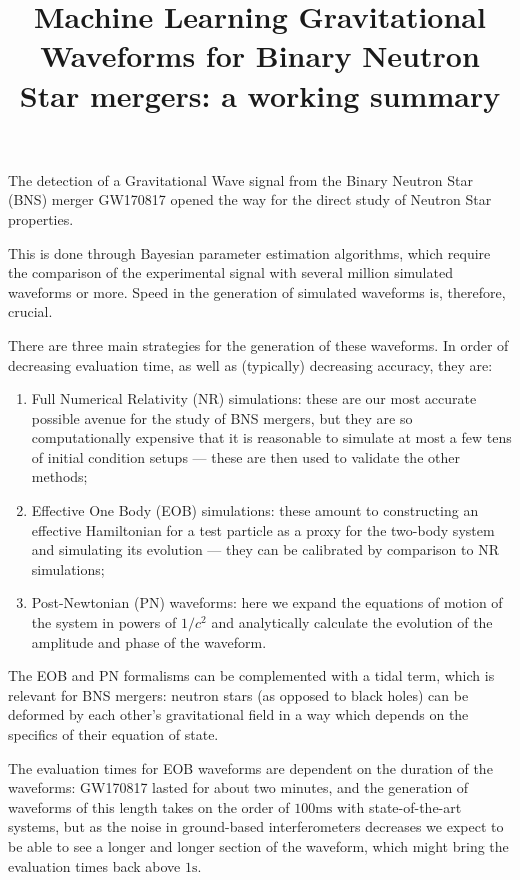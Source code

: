 \documentclass[11pt]{article}
\title{Machine Learning Gravitational Waveforms for Binary Neutron Star mergers: a working summary}
\begin{document}
\maketitle

The detection of a Gravitational Wave signal from the Binary Neutron Star (BNS) merger GW170817 opened the way for the direct study of Neutron Star properties.

This is done through Bayesian parameter estimation algorithms, which require the comparison of the experimental signal with several million \cite{lackeyEffectiveonebodyWaveformsBinary2017} simulated waveforms or more.
Speed in the generation of simulated waveforms is, therefore, crucial.

There are three main strategies for the generation of these waveforms. In order of decreasing evaluation time, as well as (typically) decreasing accuracy, they are:
\begin{enumerate}
    \item Full Numerical Relativity (NR) simulations: these are our most accurate possible avenue for the study of BNS mergers, but they are so computationally expensive that it is reasonable to simulate at most a few tens of initial condition setups --- these are then used to validate the other methods;
    \item Effective One Body (EOB) simulations: these amount to constructing an effective Hamiltonian for a test particle as a proxy for the two-body system and simulating its evolution --- they can be calibrated by comparison to NR simulations;
    \item Post-Newtonian (PN) waveforms: here we expand the equations of motion of the system in powers of $1/c^2$ and analytically calculate the evolution of the amplitude and phase of the waveform.
\end{enumerate}

The EOB and PN formalisms can be complemented with a tidal term, which is relevant for BNS mergers: neutron stars (as opposed to black holes) can be deformed by each other's gravitational field in a way which depends on the specifics of their equation of state. 

The evaluation times for EOB waveforms are dependent on the duration of the waveforms: GW170817 lasted for about two minutes, and the generation of waveforms of this length takes on the order of $100\text{ms}$ with state-of-the-art systems, but as the noise in ground-based interferometers decreases we expect to be able to see a longer and longer section of the waveform, which might bring the evaluation times back above $1\text{s}$. 
\end{document}
